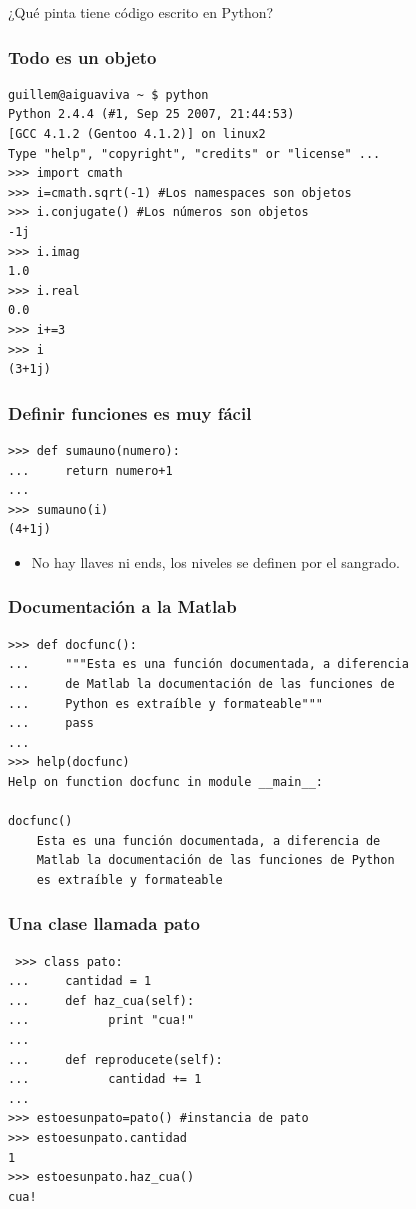 \documentclass{beamer}
\begin{document}
\begin{frame}
\begin{center}
\begin{LARGE}
¿Qué pinta tiene código escrito en Python?
\end{LARGE} 
\end{center}
\end{frame}

\begin{frame}[containsverbatim]
 \frametitle{Todo es un objeto}
\begin{verbatim}
guillem@aiguaviva ~ $ python
Python 2.4.4 (#1, Sep 25 2007, 21:44:53)
[GCC 4.1.2 (Gentoo 4.1.2)] on linux2
Type "help", "copyright", "credits" or "license" ...
>>> import cmath
>>> i=cmath.sqrt(-1) #Los namespaces son objetos
>>> i.conjugate() #Los números son objetos
-1j
>>> i.imag
1.0
>>> i.real
0.0
>>> i+=3 
>>> i
(3+1j)
\end{verbatim}
\end{frame}

\begin{frame}[containsverbatim]
 \frametitle{Definir funciones es muy fácil}
\begin{verbatim}
>>> def sumauno(numero):
...     return numero+1
...
>>> sumauno(i)
(4+1j)
\end{verbatim}
\begin{itemize}
 \item No hay llaves ni ends, los niveles se definen por el sangrado.
\end{itemize}
\end{frame}

\begin{frame}[containsverbatim]
 \frametitle{Documentación a la Matlab}
\begin{verbatim}
>>> def docfunc():
...     """Esta es una función documentada, a diferencia
...     de Matlab la documentación de las funciones de
...     Python es extraíble y formateable"""
...     pass
...
>>> help(docfunc)
Help on function docfunc in module __main__:

docfunc()
    Esta es una función documentada, a diferencia de
    Matlab la documentación de las funciones de Python
    es extraíble y formateable
\end{verbatim}
\end{frame}


\begin{frame}[containsverbatim]
\frametitle{Una clase llamada pato}
\begin{verbatim}
 >>> class pato:
...     cantidad = 1
...     def haz_cua(self):
...           print "cua!"
...
...     def reproducete(self):
...           cantidad += 1
...
>>> estoesunpato=pato() #instancia de pato
>>> estoesunpato.cantidad
1
>>> estoesunpato.haz_cua()
cua!
\end{verbatim} 
\end{frame}
\end{document}
